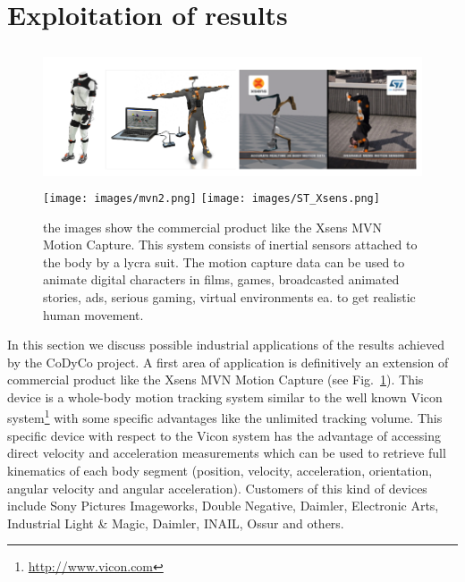 \documentclass[12pt,a4paper,twoside]{article}
\begin{document}
\section{Exploitation of results} \label{sec:exploit}

\begin{figure} 
\begin{center}
\includegraphics[height=4cm]{images/mvn.png} \texttt{[image: images/mvn2.png]} \texttt{[image: images/ST\_Xsens.png]}
\caption{the images show the commercial product like the Xsens MVN Motion Capture. This system consists of inertial sensors attached to the body by a lycra suit. The motion capture data can be used to animate digital characters in films, games, broadcasted animated stories, ads, serious gaming, virtual environments ea. to get realistic human movement.}\label{fig:xsens}
\end{center}
\end{figure}

In this section we discuss possible industrial applications of the results achieved by the CoDyCo project. A first area of application is definitively an extension of commercial product like the Xsens MVN Motion Capture (see Fig.~\ref{fig:xsens}). This device is a whole-body motion tracking system similar to the well known Vicon system\footnote{\url{http://www.vicon.com}} with some specific advantages like the unlimited tracking volume. This specific device with respect to the Vicon system has the advantage of accessing direct velocity and acceleration measurements which can be used to retrieve full kinematics of each body segment (position, velocity, acceleration, orientation, angular velocity and angular acceleration). Customers of this kind of devices include Sony Pictures Imageworks, Double Negative, Daimler, Electronic Arts, Industrial Light \& Magic, Daimler, INAIL, Ossur and others.
\end{document}
